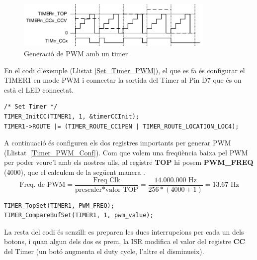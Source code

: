 \begin{figure}
 \centering
 \includegraphics[width=0.85\textwidth, keepaspectratio]{imatges/pwm_timer.png}
 \caption{Generació de PWM amb un timer \cite[262]{EFM32GRM}}
 \label{fig:pwm_timer}
\end{figure}
En el codi d'exemple (Llistat \ref{Set_Timer_PWM}), el que es fa és configurar el TIMER1 en mode PWM i connectar la sortida del Timer al Pin D7 que és on està el LED connectat.

\begin{lstlisting}[style=customc, label=Set_Timer_PWM, caption=Configuració del Timer per l'exemple PWM]
 /* Set Timer */
TIMER_InitCC(TIMER1, 1, &timerCCInit);
TIMER1->ROUTE |= (TIMER_ROUTE_CC1PEN | TIMER_ROUTE_LOCATION_LOC4);
\end{lstlisting}

A continuació és configuren els dos registres importants per generar PWM (Llistat~\ref {Timer_PWM_Conf}). Com que volem una freqüència baixa pel \gls{PWM} per poder veure'l amb els nostres ulls, al registre {\bf TOP} hi posem {\bf PWM\_FREQ} (4000), que el calculem de la següent manera \cite{EFM32GRM}.
\begin{displaymath}
\text{Freq. de PWM} = \frac{\text{Freq Clk}}{\text{prescaler} * \text{valor TOP}} = \frac{14.000.000 \text{ Hz}}{256 * (4000 +1 )} = 13.67 \text{ Hz}
\end{displaymath}

\begin{lstlisting}[style=customc, label=Timer_PWM_Conf, caption=Configuració del Timer per l'exemple PWM]
TIMER_TopSet(TIMER1, PWM_FREQ);
TIMER_CompareBufSet(TIMER1, 1, pwm_value);
\end{lstlisting}

La resta del codi és senzill: es preparen les dues interrupcions per cada un dels botons, i quan algun dels dos es prem, la \gls{ISR} modifica el valor del registre {\bf CC} del Timer (un botó augmenta el duty cycle, l'altre el disminueix).

